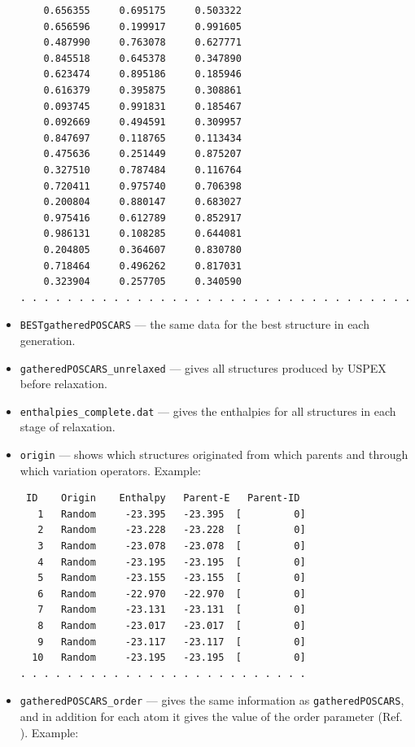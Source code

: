 \documentclass[12pt]{article}
\newcommand{\file}[1]{\texttt{#1}}
\begin{document}
\begin{itemize}
{\begin{verbatim}
    0.656355     0.695175     0.503322
    0.656596     0.199917     0.991605
    0.487990     0.763078     0.627771
    0.845518     0.645378     0.347890
    0.623474     0.895186     0.185946
    0.616379     0.395875     0.308861
    0.093745     0.991831     0.185467
    0.092669     0.494591     0.309957
    0.847697     0.118765     0.113434
    0.475636     0.251449     0.875207
    0.327510     0.787484     0.116764
    0.720411     0.975740     0.706398
    0.200804     0.880147     0.683027
    0.975416     0.612789     0.852917
    0.986131     0.108285     0.644081
    0.204805     0.364607     0.830780
    0.718464     0.496262     0.817031
    0.323904     0.257705     0.340590
. . . . . . . . . . . . . . . . . . . . . . . . . . . . . . . . . .
\end{verbatim}
}

\item \file{BESTgatheredPOSCARS} --- the same data for the best structure in
each generation.

\item \file{gatheredPOSCARS\_unrelaxed} --- gives all structures produced by
USPEX before relaxation.

\item \file{enthalpies\_complete.dat} --- gives the enthalpies for all
structures in each stage of relaxation.

\item \file{origin} --- shows which structures originated from which parents and
through which variation operators. Example:

{\tiny
\begin{verbatim}
 ID    Origin    Enthalpy   Parent-E   Parent-ID
   1   Random     -23.395   -23.395  [         0]
   2   Random     -23.228   -23.228  [         0]
   3   Random     -23.078   -23.078  [         0]
   4   Random     -23.195   -23.195  [         0]
   5   Random     -23.155   -23.155  [         0]
   6   Random     -22.970   -22.970  [         0]
   7   Random     -23.131   -23.131  [         0]
   8   Random     -23.017   -23.017  [         0]
   9   Random     -23.117   -23.117  [         0]
  10   Random     -23.195   -23.195  [         0]
. . . . . . . . . . . . . . . . . . . . . . . . .
\end{verbatim}
}

\item \file{gatheredPOSCARS\_order} --- gives the same information as
\file{gatheredPOSCARS}, and in addition for each atom it gives the value of the
order parameter (Ref. \cite{Oganov2009}). Example:


\end{itemize}
\end{document}
